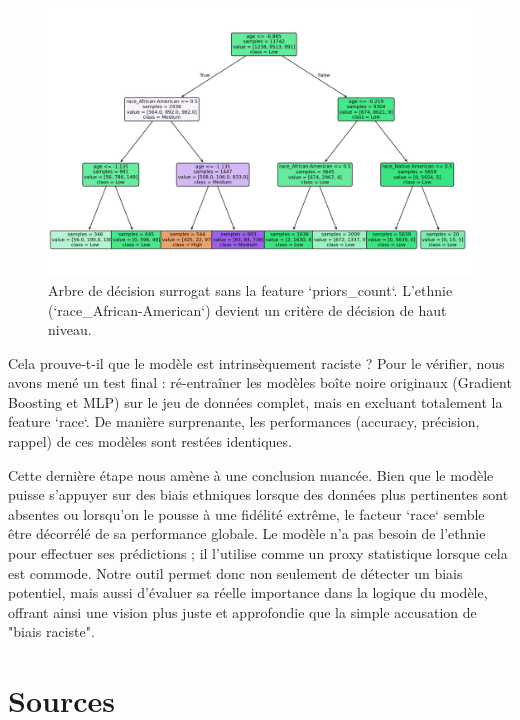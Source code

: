 \documentclass{article}
\begin{document}
\begin{figure}[h!]
    \centering
    \includegraphics[width=\textwidth]{tree_withoutprior.png}
    \caption{Arbre de décision surrogat sans la feature `priors\_count`. L'ethnie (`race\_African-American`) devient un critère de décision de haut niveau.}
    \label{fig:tree\_without\_prior}
\end{figure}

\quad Cela prouve-t-il que le modèle est intrinsèquement raciste ? Pour le vérifier, nous avons mené un test final : ré-entraîner les modèles boîte noire originaux (Gradient Boosting et MLP) sur le jeu de données complet, mais en excluant totalement la feature `race`. De manière surprenante, les performances (accuracy, précision, rappel) de ces modèles sont restées identiques.

\quad Cette dernière étape nous amène à une conclusion nuancée. Bien que le modèle puisse s'appuyer sur des biais ethniques lorsque des données plus pertinentes sont absentes ou lorsqu'on le pousse à une fidélité extrême, le facteur `race` semble être décorrélé de sa performance globale. Le modèle n'a pas besoin de l'ethnie pour effectuer ses prédictions ; il l'utilise comme un proxy statistique lorsque cela est commode. Notre outil permet donc non seulement de détecter un biais potentiel, mais aussi d'évaluer sa réelle importance dans la logique du modèle, offrant ainsi une vision plus juste et approfondie que la simple accusation de "biais raciste".


\clearpage

\section{Sources}
\end{document}
